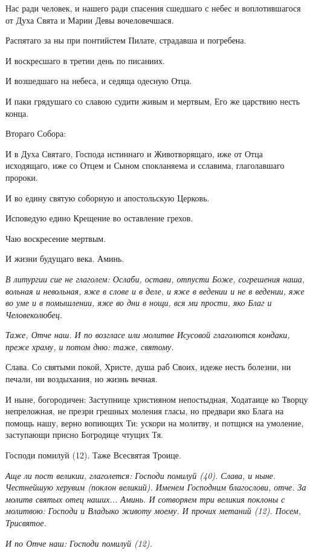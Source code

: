 Нас ради человек, и нашего ради спасения сшедшаго с небес и воплотившагося от Духа Свята и Марии Девы вочеловечшася.


Распятаго за ны при понтийстем Пилате, страдавша и погребена.


И воскресшаго в третии день по писаниих.


И возшедшаго на небеса, и седяща одесную Отца.


И паки грядушаго со славою судити живым и мертвым, Его же царствию несть конца.


Втораго Собора:


И в Духа Святаго, Господа истиннаго и Животворящаго, иже от Отца исходящаго, иже со Отцем и Сыном спокланяема и сславима, глаголавшаго пророки.


И во едину святую соборную и апостольскую Церковь.


Исповедую едино Крещение во оставление грехов.


Чаю воскресение мертвым.


И жизни будущаго века. Аминь.


\itshape В литургии сие не глаголем:\normalfont{} Ослаби, остави, отпусти Боже, согрешения наша, вольная и невольная, яже в слове и в деле, и яже в ведении и не в ведении, яже во уме и в помышлении, яже во дни в нощи, вся ми прости, яко Благ и Человеколюбец.


\itshape Таже, Отче наш. И по возгласе или молитве Исусовой глаголются кондаки, преже храму, и потом дню: таже, святому.\normalfont{}


Слава. Со святыми покой, Христе, душа раб Своих, идеже несть болезни, ни печали, ни воздыхания, но жизнь вечная.


И ныне, богородичен: Заступнице християном непостыдная, Ходатаице ко Творцу непреложная, не презри грешных моления гласы, но предвари яко Блага на помощь нашу, верно вопиющих Ти: ускори на молитву, и потщися на умоление, заступающи присно Богродице чтущих Тя.


Господи помилуй (12). Таже Всесвятая Троице.


\itshape Аще ли пост великии, глаголется:\normalfont{} Господи помилуй (40). Слава, и ныне. Честнейшую херувим (поклон великий). Именем Господним благослови, отче. За молитв святых отец наших... Аминь. И сотворяем три великия поклоны с молитвою: Господи и Владыко животу моему. И прочих метаний (12). Посем, Трисвятое.


\itshape И по Отче наш:\normalfont{} Господи помилуй (12).


